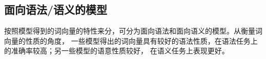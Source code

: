 \subsection{面向语法/语义的模型}
按照模型得到的词向量的特性来分，可分为面向语法和面向语义的模型。从衡量词向量的性质的角度，
一些模型得出的词向量具有较好的语法性质，在语法任务上的准确率较高；另一些模型的语意性质较好，
在语义任务上表现更好。

